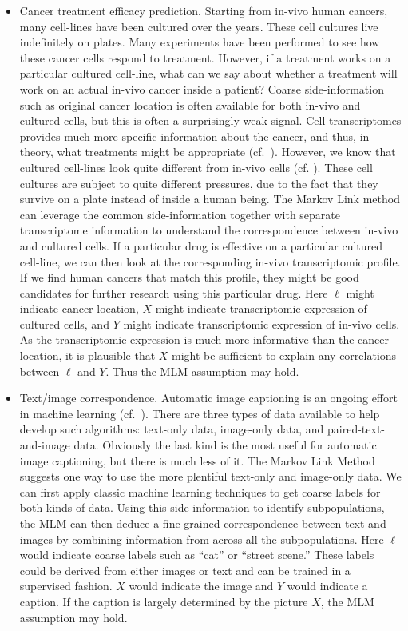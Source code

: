 \begin{itemize}
    \item Cancer treatment efficacy prediction.  Starting from in-vivo human cancers, many cell-lines have been cultured over the years.  These cell cultures live indefinitely on plates.  Many experiments have been performed to see how these cancer cells respond to treatment.  However, if a treatment works on a particular cultured cell-line, what can we say about whether a treatment will work on an actual in-vivo cancer inside a patient?  Coarse side-information such as original cancer location is often available for both in-vivo and cultured cells, but this is often a surprisingly weak signal.  Cell transcriptomes provides much more specific information about the cancer, and thus, in theory, what treatments might be appropriate (cf.\ \cite{cieslik2018cancer}).  However, we know that cultured cell-lines look quite different from in-vivo cells (cf. \cite{imamura2015comparison,haibe2013inconsistency}).   These cell cultures are subject to quite different pressures, due to the fact that they survive on a plate instead of inside a human being.  The Markov Link method can leverage the common side-information together with separate transcriptome information to understand the correspondence between in-vivo and cultured cells.  If a particular drug is effective on a particular cultured cell-line, we can then look at the corresponding in-vivo transcriptomic profile.  If we find human cancers that match this profile, they might be good candidates for further research using this particular drug.  Here $\ell$ might indicate cancer location, $X$ might indicate transcriptomic expression of cultured cells, and $Y$ might indicate transcriptomic expression of in-vivo cells.  As the transcriptomic expression is much more informative than the cancer location, it is plausible that $X$ might be sufficient to explain any correlations between $\ell$ and $Y$.  Thus the MLM assumption may hold.

    \item Text/image correspondence.  Automatic image captioning is an ongoing effort in machine learning (cf.\ \cite{srivastava2018survey}).  There are three types of data available to help develop such algorithms: text-only data, image-only data, and paired-text-and-image data.  Obviously the last kind is the most useful for automatic image captioning, but there is much less of it.  The Markov Link Method suggests one way to use the more plentiful text-only and image-only data.  We can first apply classic machine learning techniques to get coarse labels for both kinds of data.  Using this side-information to identify subpopulations, the MLM can then deduce a fine-grained correspondence between text and images by combining information from across all the subpopulations.  Here $\ell$ would indicate coarse labels such as ``cat'' or ``street scene.''  These labels could be derived from either images or text and can be trained in a supervised fashion.  $X$ would indicate the image and $Y$ would indicate a caption.  If the caption is largely determined by the picture $X$, the MLM assumption may hold.  


\end{itemize}
